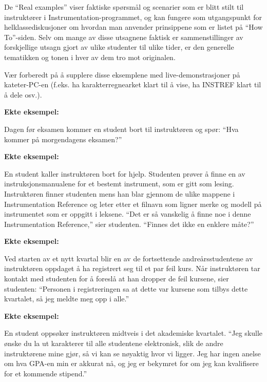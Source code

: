 \vskip 10pt

De ``Real examples'' viser faktiske spørsmål og scenarier som er blitt stilt til instruktører i Instrumentation-programmet, og kan fungere som utgangspunkt for helklassediskusjoner om hvordan man anvender prinsippene som er listet på ``How To''-siden.  Selv om mange av disse utsagnene faktisk er sammenstillinger av forskjellige utsagn gjort av ulike studenter til ulike tider, er den generelle tematikken og tonen i hver av dem tro mot originalen.

\vskip 10pt

Vær forberedt på å supplere disse eksemplene med live-demonstrasjoner på kateter-PC-en (f.eks. ha karakterregnearket klart til å vise, ha INSTREF klart til å dele osv.).







\vfil \eject
\noindent
{\bf Ekte eksempel:} 

Dagen før eksamen kommer en student bort til instruktøren og spør: ``Hva kommer på morgendagens eksamen?''






\vfil \eject
\noindent
{\bf Ekte eksempel:} 

En student kaller instruktøren bort for hjelp.  Studenten prøver å finne en av instruksjonsmanualene for et bestemt instrument, som er gitt som lesing.  Instruktøren finner studenten mens han blar gjennom de ulike mappene i Instrumentation Reference og leter etter et filnavn som ligner merke og modell på instrumentet som er oppgitt i leksene.  ``Det er så vanskelig å finne noe i denne Instrumentation Reference,'' sier studenten.  ``Finnes det ikke en enklere måte?''






\vfil \eject
\noindent
{\bf Ekte eksempel:} 

Ved starten av et nytt kvartal blir en av de fortsettende andreårsstudentene av instruktøren oppdaget å ha registrert seg til et par feil kurs.  Når instruktøren tar kontakt med studenten for å foreslå at han dropper de feil kursene, sier studenten: ``Personen i registreringen sa at dette var kursene som tilbys dette kvartalet, så jeg meldte meg opp i alle.''






\vfil \eject
\noindent
{\bf Ekte eksempel:} 

En student oppsøker instruktøren midtveis i det akademiske kvartalet.  ``Jeg skulle ønske du la ut karakterer til alle studentene elektronisk, slik de andre instruktørene mine gjør, så vi kan se nøyaktig hvor vi ligger.  Jeg har ingen anelse om hva GPA-en min er akkurat nå, og jeg er bekymret for om jeg kan kvalifisere for et kommende stipend.''






